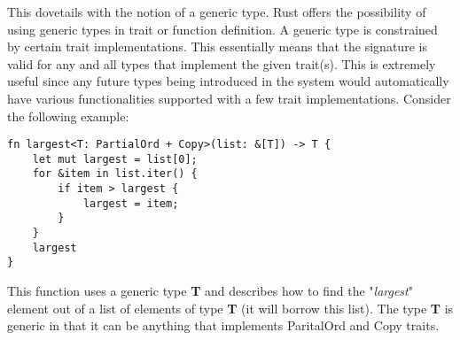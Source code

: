 This dovetails with the notion of a generic type. Rust offers the possibility of using generic types in trait or function definition. A generic type is constrained by certain trait implementations. This essentially means that the signature is valid for any and all types that implement the given trait(s). This is extremely useful since any future types being introduced in the system would automatically have various functionalities supported with a few trait implementations. Consider the following example:

\begin{verbatim}
fn largest<T: PartialOrd + Copy>(list: &[T]) -> T {
    let mut largest = list[0];
    for &item in list.iter() {
        if item > largest {
            largest = item;
        }
    }
    largest
}
\end{verbatim}

This function uses a generic type \textbf{T} and describes how to find the "\emph{largest}" element out of a list of elements of type \textbf{T} (it will borrow this list). The type \textbf{T} is generic in that it can be anything that implements ParitalOrd and Copy traits.
